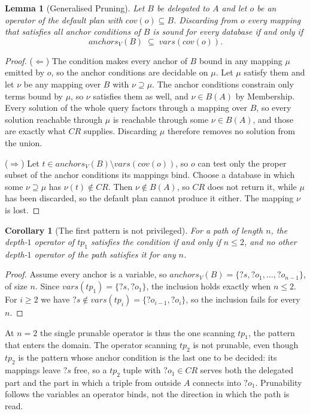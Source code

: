 \documentclass{article}
\newtheorem{lemma}{Lemma}
\newtheorem{corollary}{Corollary}
\begin{document}
\begin{lemma}[Generalised Pruning]
Let $B$ be delegated to $A$ and let $o$ be an operator of the default plan with
$\mathit{cov}(o) \subseteq B$. Discarding from $o$ every mapping that satisfies all
anchor conditions of $B$ is sound for every database if and only if
\[
\mathit{anchors}_V(B) \;\subseteq\; \mathit{vars}(\mathit{cov}(o)).
\]
\end{lemma}

\begin{proof}
($\Leftarrow$) The condition makes every anchor of $B$ bound in any mapping $\mu$ emitted
by $o$, so the anchor conditions are decidable on $\mu$. Let $\mu$ satisfy them and let
$\nu$ be any mapping over $B$ with $\nu \supseteq \mu$. The anchor conditions constrain
only terms bound by $\mu$, so $\nu$ satisfies them as well, and $\nu \in B(A)$ by
Membership. Every solution of the whole query factors through a mapping over $B$, so
every solution reachable through $\mu$ is reachable through some $\nu \in B(A)$, and
those are exactly what $CR$ supplies. Discarding $\mu$ therefore removes no solution
from the union.

($\Rightarrow$) Let $t \in \mathit{anchors}_V(B) \setminus
\mathit{vars}(\mathit{cov}(o))$, so $o$ can test only the proper subset of the anchor
conditions its mappings bind. Choose a database in which some $\nu \supseteq \mu$ has
$\nu(t) \notin CR$. Then $\nu \notin B(A)$, so $CR$ does not return it, while $\mu$ has
been discarded, so the default plan cannot produce it either. The mapping $\nu$ is lost.
\end{proof}

\begin{corollary}[The first pattern is not privileged]
For a path of length $n$, the depth-$1$ operator of $tp_1$ satisfies the condition if
and only if $n \leq 2$, and no other depth-$1$ operator of the path satisfies it for any
$n$.
\end{corollary}

\begin{proof}
Assume every anchor is a variable, so $\mathit{anchors}_V(B) = \{?s, ?o_1, \dots,
?o_{n-1}\}$, of size $n$. Since $\mathit{vars}(tp_1) = \{?s, ?o_1\}$, the inclusion
holds exactly when $n \leq 2$. For $i \geq 2$ we have $?s \notin \mathit{vars}(tp_i) =
\{?o_{i-1}, ?o_i\}$, so the inclusion fails for every $n$.
\end{proof}

At $n = 2$ the single prunable operator is thus the one scanning $tp_1$, the pattern that
enters the domain. The operator scanning $tp_2$ is not prunable, even though $tp_2$ is
the pattern whose anchor condition is the last one to be decided: its mappings leave
$?s$ free, so a $tp_2$ tuple with $?o_1 \in CR$ serves both the delegated part and the
part in which a triple from outside $A$ connects into $?o_1$. Prunability follows the
variables an operator binds, not the direction in which the path is read.
\end{document}
